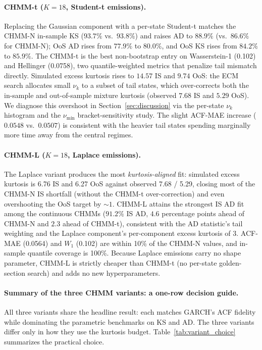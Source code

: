 \paragraph{CHMM-t ($K = 18$, Student-t emissions).}
Replacing the Gaussian component with a per-state Student-t matches the CHMM-N in-sample KS ($93.7\%$ vs.\ $93.8\%$) and raises AD to $88.9\%$ (vs.\ $86.6\%$ for CHMM-N); OoS AD rises from $77.9\%$ to $80.0\%$, and OoS KS rises from $84.2\%$ to $85.9\%$.
The CHMM-t is the best non-bootstrap entry on Wasserstein-1 (0.102) and Hellinger (0.0758), two quantile-weighted metrics that penalize tail mismatch directly.
Simulated excess kurtosis rises to $14.57$ IS and $9.74$ OoS: the ECM search allocates small $\nu_k$ to a subset of tail states, which over-corrects both the in-sample and out-of-sample mixture kurtosis (observed $7.68$ IS and $5.29$ OoS).
We diagnose this overshoot in Section~\ref{sec:discussion} via the per-state $\nu_k$ histogram and the $\nu_{\min}$ bracket-sensitivity study.
The slight ACF-MAE increase ($0.0548$ vs.\ $0.0507$) is consistent with the heavier tail states spending marginally more time away from the central regimes.

\paragraph{CHMM-L ($K = 18$, Laplace emissions).}
The Laplace variant produces the most \emph{kurtosis-aligned} fit: simulated excess kurtosis is 6.76 IS and 6.27 OoS against observed 7.68 / 5.29, closing most of the CHMM-N IS shortfall (without the CHMM-t over-correction) and even overshooting the OoS target by $\sim 1$.
CHMM-L attains the strongest IS AD fit among the continuous CHMMs ($91.2\%$ IS AD, $4.6$ percentage points ahead of CHMM-N and $2.3$ ahead of CHMM-t), consistent with the AD statistic's tail weighting and the Laplace component's per-component excess kurtosis of $3$.
ACF-MAE (0.0564) and $W_1$ (0.102) are within 10\% of the CHMM-N values, and in-sample quantile coverage is 100\%.
Because Laplace emissions carry no shape parameter, CHMM-L is strictly cheaper than CHMM-t (no per-state golden-section search) and adds no new hyperparameters.

\paragraph{Summary of the three CHMM variants: a one-row decision guide.}
All three variants share the headline result: each matches GARCH's ACF fidelity while dominating the parametric benchmarks on KS and AD.
The three variants differ only in how they use the kurtosis budget.
Table~\ref{tab:variant_choice} summarizes the practical choice.

